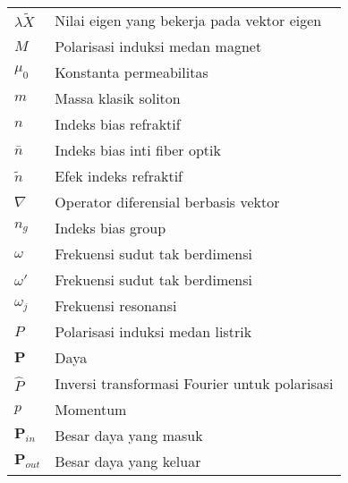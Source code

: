 \begin{center}
\begin{tabular}{lp{}}
  $\lambda\tilde{X}$ & Nilai eigen yang bekerja pada vektor eigen\\
  $M$ & Polarisasi induksi medan magnet\\
  $\mu_0$ & Konstanta permeabilitas\\
  $m$ & Massa klasik soliton\\
  $n$ & Indeks bias refraktif\\
  $\bar{n}$ & Indeks bias inti fiber optik\\
  $\tilde{n}$ & Efek indeks refraktif\\
  $\nabla$ & Operator diferensial berbasis vektor\\
  $n_g$ & Indeks bias group\\
  $\omega$ & Frekuensi sudut tak berdimensi\\
  $\omega'$ & Frekuensi sudut tak berdimensi \\
  $\omega_j$ & Frekuensi resonansi\\
  $P$ & Polarisasi induksi medan listrik\\
  $\mathbf{P}$ & Daya\\
  $\hat{P}$ & Inversi transformasi Fourier untuk polarisasi\\
  $p$ & Momentum\\
  $\mathbf{P}_{in}$ & Besar daya yang masuk\\
  $\mathbf{P}_{out}$ & Besar daya yang keluar\\


\end{tabular}
\end{center}
